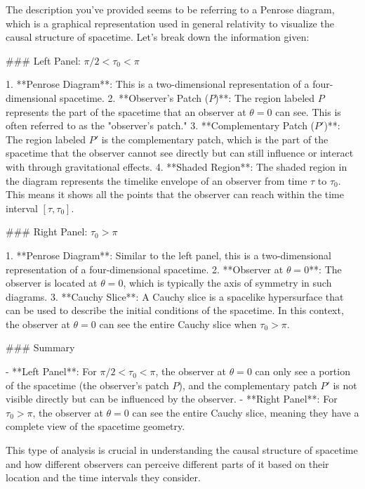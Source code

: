 The description you've provided seems to be referring to a Penrose diagram, which is a graphical representation used in general relativity to visualize the causal structure of spacetime. Let's break down the information given:

### Left Panel: $\pi/2 < \tau_0 < \pi$

1. **Penrose Diagram**: This is a two-dimensional representation of a four-dimensional spacetime.
2. **Observer's Patch ($P$)**: The region labeled \( P \) represents the part of the spacetime that an observer at \(\theta = 0\) can see. This is often referred to as the "observer's patch."
3. **Complementary Patch ($P'$)**: The region labeled \( P' \) is the complementary patch, which is the part of the spacetime that the observer cannot see directly but can still influence or interact with through gravitational effects.
4. **Shaded Region**: The shaded region in the diagram represents the timelike envelope of an observer from time \(\tau\) to \(\tau_0\). This means it shows all the points that the observer can reach within the time interval \([\tau, \tau_0]\).

### Right Panel: $\tau_0 > \pi$

1. **Penrose Diagram**: Similar to the left panel, this is a two-dimensional representation of a four-dimensional spacetime.
2. **Observer at \(\theta = 0\)**: The observer is located at \(\theta = 0\), which is typically the axis of symmetry in such diagrams.
3. **Cauchy Slice**: A Cauchy slice is a spacelike hypersurface that can be used to describe the initial conditions of the spacetime. In this context, the observer at \(\theta = 0\) can see the entire Cauchy slice when \(\tau_0 > \pi\).

### Summary

- **Left Panel**: For \(\pi/2 < \tau_0 < \pi\), the observer at \(\theta = 0\) can only see a portion of the spacetime (the observer's patch \(P\)), and the complementary patch \(P'\) is not visible directly but can be influenced by the observer.
- **Right Panel**: For \(\tau_0 > \pi\), the observer at \(\theta = 0\) can see the entire Cauchy slice, meaning they have a complete view of the spacetime geometry.

This type of analysis is crucial in understanding the causal structure of spacetime and how different observers can perceive different parts of it based on their location and the time intervals they consider.